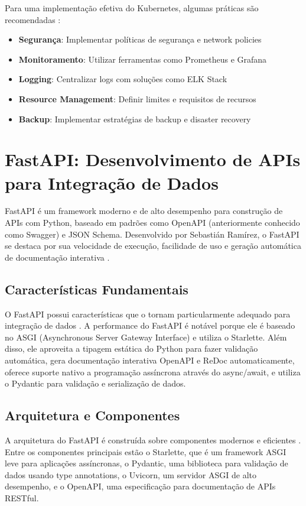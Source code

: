 Para uma implementação efetiva do Kubernetes, algumas práticas são recomendadas \cite{arundel2021kubernetes}:

\begin{itemize}
\item \textbf{Segurança}: Implementar políticas de segurança e network policies
\item \textbf{Monitoramento}: Utilizar ferramentas como Prometheus e Grafana
\item \textbf{Logging}: Centralizar logs com soluções como ELK Stack
\item \textbf{Resource Management}: Definir limites e requisitos de recursos
\item \textbf{Backup}: Implementar estratégias de backup e disaster recovery
\end{itemize}




\section{FastAPI: Desenvolvimento de APIs para Integração de Dados}
FastAPI é um framework moderno e de alto desempenho para construção de APIs com Python, baseado em padrões como OpenAPI (anteriormente conhecido como Swagger) e JSON Schema. Desenvolvido por Sebastián Ramírez, o FastAPI se destaca por sua velocidade de execução, facilidade de uso e geração automática de documentação interativa \cite{fastapi_foundation}.
\subsection{Características Fundamentais}
O FastAPI possui características que o tornam particularmente adequado para integração de dados \cite{ramirez2022fastapi}. A performance do FastAPI é notável porque ele é baseado no ASGI (Asynchronous Server Gateway Interface) e utiliza o Starlette. Além disso, ele aproveita a tipagem estática do Python para fazer validação automática, gera documentação interativa OpenAPI e ReDoc automaticamente, oferece suporte nativo a programação assíncrona através do async/await, e utiliza o Pydantic para validação e serialização de dados.
\subsection{Arquitetura e Componentes}
A arquitetura do FastAPI é construída sobre componentes modernos e eficientes \cite{kumar2023modern}. Entre os componentes principais estão o Starlette, que é um framework ASGI leve para aplicações assíncronas, o Pydantic, uma biblioteca para validação de dados usando type annotations, o Uvicorn, um servidor ASGI de alto desempenho, e o OpenAPI, uma especificação para documentação de APIs RESTful.
